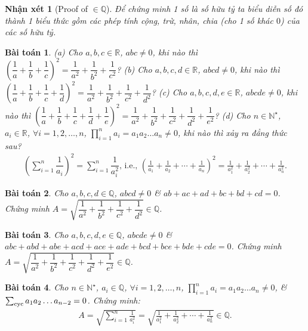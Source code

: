 \documentclass{article}
\newtheorem{baitoan}{Bài toán}
\newtheorem{nhanxet}{Nhận xét}
\begin{document}
\begin{nhanxet}[Proof of $\in\mathbb{Q}$]
	Để chứng minh 1 số là số hữu tỷ ta biểu diễn số đó thành 1 biểu thức gồm các phép tính cộng, trừ, nhân, chia (cho 1 số khác $0$) của các số hữu tỷ.
\end{nhanxet}

\begin{baitoan}
	(a) Cho $a,b,c\in\mathbb{R}$, $abc\ne0$, khi nào thì $\left(\dfrac{1}{a} + \dfrac{1}{b} + \dfrac{1}{c}\right)^2 = \dfrac{1}{a^2} + \dfrac{1}{b^2} + \dfrac{1}{c^2}$? (b) Cho $a,b,c,d\in\mathbb{R}$, $abcd\ne0$, khi nào thì $\left(\dfrac{1}{a} + \dfrac{1}{b} + \dfrac{1}{c} + \dfrac{1}{d}\right)^2 = \dfrac{1}{a^2} + \dfrac{1}{b^2} + \dfrac{1}{c^2} + \dfrac{1}{d^2}$? (c) Cho $a,b,c,d,e\in\mathbb{R}$, $abcde\ne0$, khi nào thì $\left(\dfrac{1}{a} + \dfrac{1}{b} + \dfrac{1}{c} + \dfrac{1}{d} + \dfrac{1}{e}\right)^2 = \dfrac{1}{a^2} + \dfrac{1}{b^2} + \dfrac{1}{c^2} + \dfrac{1}{d^2} + \dfrac{1}{e^2}$? (d) Cho $n\in\mathbb{N}^\star$, $a_i\in\mathbb{R}$, $\forall i = 1,2,\ldots,n$, $\prod_{i=1}^n a_i = a_1a_2\ldots a_n\ne0$, khi nào thì xảy ra đẳng thức sau?
	\begin{align*}
		\left(\sum_{i=1}^n \dfrac{1}{a_i}\right)^2 = \sum_{i=1}^n \dfrac{1}{a_i^2}\mbox{, i.e., } \left(\frac{1}{a_1} + \frac{1}{a_2} + \cdots + \frac{1}{a_n}\right)^2 = \frac{1}{a_1^2} + \frac{1}{a_2^2} + \cdots + \frac{1}{a_n^2}.
	\end{align*}
\end{baitoan}

\begin{baitoan}
	Cho $a,b,c,d\in\mathbb{Q}$, $abcd\ne0$ \& $ab + ac + ad + bc + bd + cd = 0$. Chứng minh $A = \sqrt{\dfrac{1}{a^2} + \dfrac{1}{b^2} + \dfrac{1}{c^2} + \dfrac{1}{d^2}}\in\mathbb{Q}$.
\end{baitoan}

\begin{baitoan}
	Cho $a,b,c,d,e\in\mathbb{Q}$, $abcde\ne0$ \& $abc + abd + abe + acd + ace + ade + bcd + bce + bde + cde = 0$. Chứng minh $A = \sqrt{\dfrac{1}{a^2} + \dfrac{1}{b^2} + \dfrac{1}{c^2} + \dfrac{1}{d^2} + \dfrac{1}{e^2}}\in\mathbb{Q}$.
\end{baitoan}

\begin{baitoan}
	Cho $n\in\mathbb{N}^\star$, $a_i\in\mathbb{Q}$, $\forall i = 1,2,\ldots,n$, $\prod_{i=1}^n a_i = a_1a_2\ldots a_n\ne0$, \& $\sum_{\rm cyc} a_1a_2\ldots a_{n-2} = 0$. Chứng minh:
	\begin{align*}
		A = \sqrt{\sum_{i=1}^n \frac{1}{a_i^2}} = \sqrt{\frac{1}{a_1^2} + \frac{1}{a_2^2} + \cdots + \frac{1}{a_n^2}}\in\mathbb{Q}.
	\end{align*}
\end{baitoan}
\end{document}
